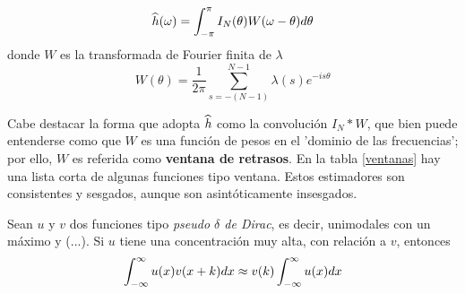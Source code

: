 \begin{equation*}
\widehat{ h }(\omega) = \int_{-\pi}^{\pi} I_N(\theta) W(\omega-\theta) d\theta
\end{equation*}
donde $W$ es la transformada de Fourier finita de $\lambda$
\begin{equation*}
W(\theta) = \frac{1}{2\pi} \sum_{s = -(N-1)}^{N-1} \lambda(s) e^{-is\theta}
\end{equation*}

Cabe destacar la forma que adopta $\widehat{ h }$ como la convolución $I_N \ast W$, que bien puede 
entenderse como que $W$ es una función de pesos en el 'dominio de las frecuencias'; por ello, $W$ 
es referida como \textbf{ventana de retrasos}.
En la tabla \ref{ventanas} hay una lista corta de algunas funciones tipo ventana. Estos estimadores 
son consistentes y sesgados, aunque son asintóticamente insesgados.


\begin{proposicion}
Sean $u$ y $v$ dos funciones tipo \textit{pseudo $\delta$ de Dirac}, es decir, unimodales con un
máximo  y (...). Si $u$ tiene una concentración muy alta, con relación a $v$, entonces
\begin{equation*}
\int_{-\infty}^{\infty} u(x) v(x+k) dx \approx v(k) \int_{-\infty}^{\infty} u(x) dx
\end{equation*}
\label{pseudo_d}
\end{proposicion}


